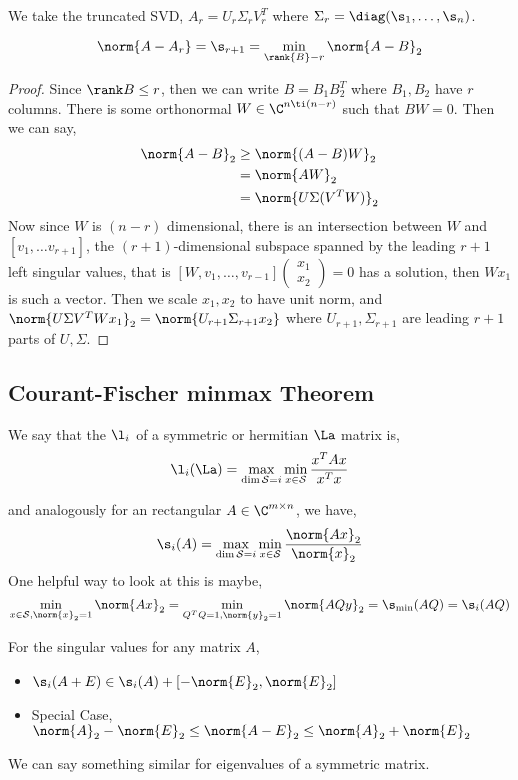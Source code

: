 
\noindent
We take the truncated SVD, $A_r = U_r\Sigma_r V_r^T$ where $\Sigma_r = \diag(\s_1, \dots, \s_n)$.
\begin{nlemma}
  $$ \norm{A - A_r} = \s_{r+1} = \min_{\rank{B} - r} \norm{A - B}_2 $$
\end{nlemma}
\begin{proof}
  Since $\rank B \le r$, then we can write $B = B_1B_2^T$ where $B_1, B_2$ have $r$ columns. There is some orthonormal $W \in \C^{n\ti (n - r)}$ such that $BW = 0$. Then we can say,
  \begin{align*}
    \norm{A - B}_2 &\ge \norm{(A - B)W}_2 \\
    &= \norm{AW}_2 \\
    &= \norm{U\Sigma (V^TW)}_2
  \end{align*}
  Now since $W$ is $(n-r)$ dimensional, there is an intersection between $W$ and $[v_1, \dots v_{r+1}]$, the $(r+1)$-dimensional subspace spanned by the leading $r+1$ left singular values, that is $[W, v_1, \dots, v_{r-1}] \begin{pmatrix}
    x_1 \\ x_2
  \end{pmatrix} = 0$ has a solution, then $Wx_1$ is such a vector. Then we scale $x_1, x_2$ to have unit norm, and $\norm{U\Sigma V^T Wx_1}_2 = \norm{U_{r+1}\Sigma_{r+1}x_2}$ where $U_{r+1}, \Sigma_{r+1}$ are leading $r+1$ parts of $U, \Sigma$. %
\end{proof}

\subsection{Courant-Fischer minmax Theorem}
We say that the $\l_i$ of a symmetric or hermitian $\La$ matrix is,
$$ \l_i(\La) = \max_{\dim \mathcal{S} = i}\min_{x \in \mathcal{S}} \frac{x^T Ax}{x^Tx} $$

and analogously for an rectangular $A \in \C^{m \times n}$, we have,
$$ \s_i(A) = \max_{\dim \mathcal{S} = i}\min_{x \in \mathcal{S}} \frac{\norm{Ax}_2}{\norm{x}_2} $$
One helpful way to look at this is maybe,
$$ \min_{x \in \mathcal{S}, \norm{x}_2 = 1} \norm{Ax}_2 = \min_{Q^TQ = 1, \norm{y}_2 = 1} \norm{AQy}_2 = \s_{\text{min}}(AQ) = \s_i(AQ)  $$

\begin{ncor}
   For the singular values for any matrix $A$,
   \begin{itemize}
     \item $\s_i(A+E) \in \s_i(A) + [-\norm{E}_2, \norm{E}_2]$
     \item Special Case, $\norm{A}_2 - \norm{E}_2 \le \norm{A - E}_2 \le \norm{A}_2 + \norm{E}_2$
   \end{itemize}
\end{ncor}
We can say something similar for eigenvalues of a symmetric matrix. 